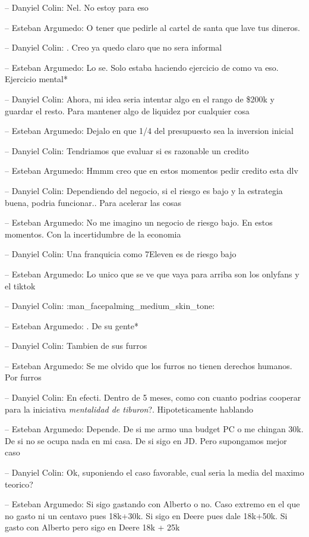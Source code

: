 -- Danyiel Colin: Nel. No estoy para eso

-- Esteban Argumedo: O tener que pedirle al cartel de santa que lave tus
dineros.

-- Danyiel Colin: . Creo ya quedo claro que no sera informal

-- Esteban Argumedo: Lo se. Solo estaba haciendo ejercicio de como va
eso. Ejercicio mental*

-- Danyiel Colin: Ahora, mi idea seria intentar algo en el rango de
\$200k y guardar el resto. Para mantener algo de liquidez por cualquier
cosa

-- Esteban Argumedo: Dejalo en que 1/4 del presupuesto sea la inversion
inicial

-- Danyiel Colin: Tendriamos que evaluar si es razonable un credito

-- Esteban Argumedo: Hmmm creo que en estos momentos pedir credito esta
dlv

-- Danyiel Colin: Dependiendo del negocio, si el riesgo es bajo y la
estrategia buena, podria funcionar.. Para acelerar las cosas

-- Esteban Argumedo: No me imagino un negocio de riesgo bajo. En estos
momentos. Con la incertidumbre de la economia

-- Danyiel Colin: Una franquicia como 7Eleven es de riesgo bajo

-- Esteban Argumedo: Lo unico que se ve que vaya para arriba son los
onlyfans y el tiktok

-- Danyiel Colin: :man\_facepalming\_medium\_skin\_tone:

-- Esteban Argumedo: . De su gente*

-- Danyiel Colin: Tambien de sus furros

-- Esteban Argumedo: Se me olvido que los furros no tienen derechos
humanos. Por furros

-- Danyiel Colin: En efecti. Dentro de 5 meses, como con cuanto podrias
cooperar para la iniciativa \emph{mentalidad de tiburon}?.
Hipoteticamente hablando

-- Esteban Argumedo: Depende. De si me armo una budget PC o me chingan
30k. De si no se ocupa nada en mi casa. De si sigo en JD. Pero
supongamos mejor caso

-- Danyiel Colin: Ok, suponiendo el caso favorable, cual seria la media
del maximo teorico?

-- Esteban Argumedo: Si sigo gastando con Alberto o no. Caso extremo en
el que no gasto ni un centavo pues 18k+30k. Si sigo en Deere pues dale
18k+50k. Si gasto con Alberto pero sigo en Deere 18k + 25k

